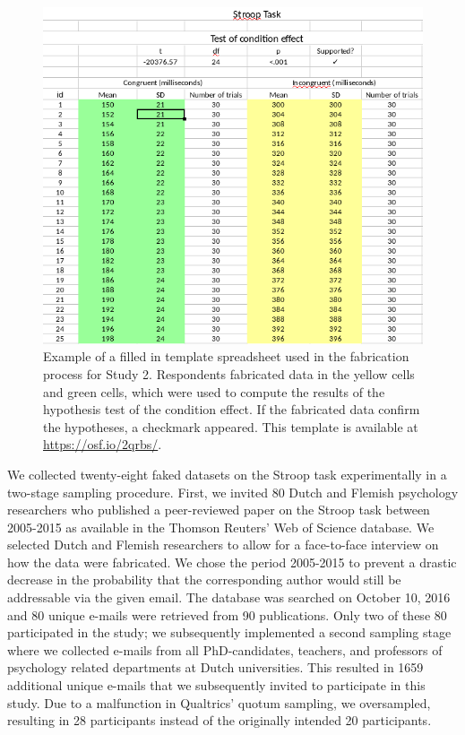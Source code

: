 \documentclass{article}
\begin{document}
\begin{figure}
\begin{center}
\includegraphics[width=\textwidth,height=\textheight,keepaspectratio]{../figures/spreadsheet2.png}
\caption{Example of a filled in template spreadsheet used in the fabrication process for Study 2. Respondents fabricated data in the yellow cells and green cells, which were used to compute the results of the hypothesis test of the condition effect. If the fabricated data confirm the hypotheses, a checkmark appeared. This template is available at \url{https://osf.io/2qrbs/}.}
\label{spreadsheet2}
\end{center}
\end{figure}

We collected twenty-eight faked datasets on the Stroop task experimentally in a two-stage sampling procedure. First, we invited 80 Dutch and Flemish psychology researchers who published a peer-reviewed paper on the Stroop task between 2005-2015 as available in the Thomson Reuters’ Web of Science database. We selected Dutch and Flemish researchers to allow for a face-to-face interview on how the data were fabricated. We chose the period 2005-2015 to prevent a drastic decrease in the probability that the corresponding author would still be addressable via the given email. The database was searched on October 10, 2016 and 80 unique e-mails were retrieved from 90 publications. Only two of these 80 participated in the study; we subsequently implemented a second sampling stage where we collected e-mails from all PhD-candidates, teachers, and professors of psychology related departments at Dutch universities. This resulted in 1659 additional unique e-mails that we subsequently invited to participate in this study. Due to a malfunction in Qualtrics' quotum sampling, we oversampled, resulting in 28 participants instead of the originally intended 20 participants.
\end{document}
